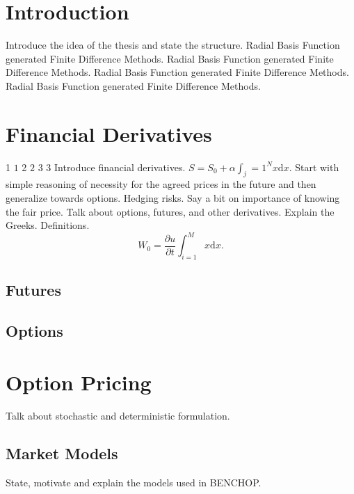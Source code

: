 \documentclass{UUThesisTemplate}
\begin{document}
\chapter{Introduction}
\par
Introduce the idea of the thesis and state the structure. Radial Basis Function generated Finite Difference Methods. Radial Basis Function generated Finite Difference Methods. Radial Basis Function generated Finite Difference Methods. Radial Basis Function generated Finite Difference Methods.
\chapter{Financial Derivatives}
1 $1$ 2 $2$ 3 $3$
Introduce financial derivatives. $S=S_0+\alpha \int_j=1^Nx \mathrm{d}x$. Start with simple reasoning of necessity for the agreed prices in the future and then generalize towards options. Hedging risks. Say a bit on importance of knowing the fair price. Talk about options, futures, and other derivatives. Explain the Greeks. Definitions.
\begin{equation}
W_{0} = \frac{\partial u}{\partial t} \int_{i=1}^{M} x \mathrm{d}x.
\end{equation}
\section{Futures}
\section{Options}
\chapter{Option Pricing}
Talk about stochastic and deterministic formulation.
\section{Market Models}
State, motivate and explain the models used in BENCHOP.
\end{document}
